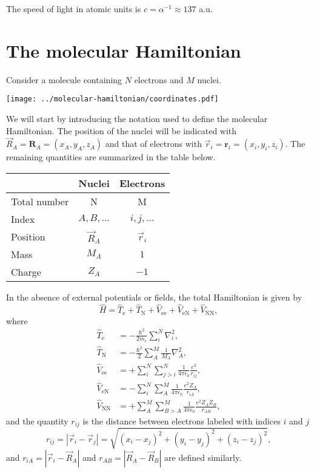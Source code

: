 \documentclass[../Main/chem532-notes.tex]{subfiles}
\begin{document}
The speed of light in atomic units is $c = \alpha^{-1}\approx 137$ a.u.

\newpage

\section{The molecular Hamiltonian}
Consider a molecule containing $N$ electrons and $M$ nuclei.

\begin{center}
\texttt{[image: ../molecular-hamiltonian/coordinates.pdf]}
\end{center}

We will start by introducing the notation used to define the molecular Hamiltonian.
The position of the nuclei will be indicated with $\vec{R}_A = \mathbf{R}_A = (x_A,y_A,z_A)$ and that of electrons with $\vec{r}_i = \mathbf{r}_i = (x_i,y_i,z_i)$.
The remaining quantities are summarized in the table below.
\begin{table}[h]
\centering
\begin{tabular}{lcc}
& Nuclei & Electrons \\
\hline
Total number & N & M \\
Index & $A, B, \ldots$ & $i, j, \ldots$ \\
Position & $\vec{R}_A$ & $\vec{r}_i$ \\
Mass & $M_A$ & $1$ \\
Charge & $Z_A$ & $-1$ \\
\end{tabular}
\end{table}

In the absence of external potentials or fields, the total Hamiltonian is given by
\begin{equation}
\hat{H} = \hat{T}_\mathrm{e} +\hat{T}_\mathrm{N} +  \hat{V}_\mathrm{ee} + \hat{V}_\mathrm{eN} + \hat{V}_\mathrm{NN},
\end{equation}
where
\begin{align}
\hat{T}_\mathrm{e} &= -\frac{\hbar^2}{2 m_e} \sum_i^N \nabla^2_i, \\
\hat{T}_\mathrm{N} &= -\frac{\hbar^2}{2} \sum_A^M \frac{1}{M_A} \nabla^2_A, \\
\hat{V}_\mathrm{ee} &= +\sum_{i}^{N}\sum_{j > i}^{N} \frac{1}{4 \pi \epsilon_0} \frac{e^2}{r_{ij}},\\
\hat{V}_\mathrm{eN} &= - \sum_{i}^{N} \sum_{A}^{M} \frac{1}{4 \pi \epsilon_0} \frac{e^2 Z_A}{r_{iA}}, \\
\hat{V}_\mathrm{NN} &= +\sum_{A}^{M} \sum_{B > A}^{M} \frac{1}{4 \pi \epsilon_0} \frac{e^2 Z_A Z_B}{r_{AB}},
\end{align}
and the quantity $r_{ij}$ is the distance between electrons labeled with indices $i$ and $j$
\begin{equation}
r_{ij} = |\vec{r}_i - \vec{r}_j| = \sqrt{(x_i-x_j)^2 + (y_i-y_j)^2 + (z_i-z_j)^2},
\end{equation}
and $r_{iA} = |\vec{r}_i - \vec{R}_A|$ and $r_{AB} = |\vec{R}_A - \vec{R}_B|$ are defined similarly.
\end{document}
